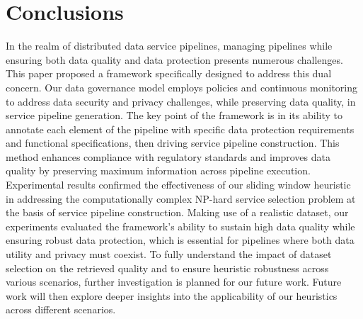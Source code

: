 \documentclass[sn-mathphys-num,referee]{sn-jnl}
\theoremstyle{definition}
\begin{document}











\section{Conclusions}\label{sec:conclusions}
In the realm of distributed data service pipelines, managing pipelines while ensuring both data quality and data protection presents numerous challenges. This paper proposed a framework specifically designed to address this dual concern. Our data governance model employs policies and continuous monitoring to address data security and privacy challenges, while preserving data quality, in service pipeline generation. The key point of the framework is in its ability to annotate each element of the pipeline with specific data protection requirements and functional specifications, then driving service pipeline construction. This method enhances compliance with regulatory standards and improves data quality by preserving maximum information across pipeline execution. Experimental results confirmed the effectiveness of our sliding window heuristic in addressing the computationally complex NP-hard service selection problem at the basis of service pipeline construction. Making use of a realistic dataset, our experiments evaluated the framework's ability to sustain high data quality while ensuring robust data protection, which is essential for pipelines where both data utility and privacy must coexist. To fully understand the impact of dataset selection on the retrieved quality and to ensure heuristic robustness across various scenarios, further investigation is planned for our future work. Future work will then %
explore deeper insights into the applicability of our heuristics across different scenarios.


\clearpage
\end{document}
